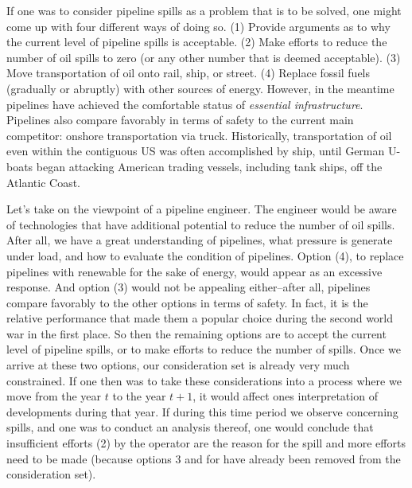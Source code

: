 \documentclass[12pt, man, natbib]{apa6}
\begin{document}
	If one was to consider pipeline spills as a problem that is to be solved, one might come up with four different ways of doing so. (1) Provide arguments as to why the current level of pipeline spills is acceptable. (2) Make efforts to reduce the number of oil spills to zero (or any other number that is deemed acceptable). (3) Move transportation of oil onto rail, ship, or street. (4) Replace fossil fuels (gradually or abruptly) with other sources of energy. However, in the meantime pipelines have achieved the comfortable status of \textit{essential infrastructure}. Pipelines also compare favorably in terms of safety to the current main competitor: onshore transportation via truck. Historically, transportation of oil even within the contiguous US was often accomplished by ship, until German U-boats began attacking American trading vessels, including tank ships, off the Atlantic Coast.
	
	Let's take on the viewpoint of a pipeline engineer. The engineer would be aware of technologies that have additional potential to reduce the number of oil spills. After all, we have a great understanding of pipelines, what pressure is generate under load, and how to evaluate the condition of pipelines. Option (4), to replace pipelines with renewable for the sake of energy, would appear as an excessive response. And option (3) would not be appealing either--after all, pipelines compare favorably to the other options in terms of safety. In fact, it is the relative performance that made them a popular choice during the second world war in the first place. So then the remaining options are to accept the current level of pipeline spills, or to make efforts to reduce the number of spills. Once we arrive at these two options, our consideration set is already very much constrained. If one then was to take these considerations into a process where we move from the year $t$ to the year $t+1$, it would affect ones interpretation of developments during that year. If during this time period we observe concerning spills, and one was to conduct an analysis thereof, one would conclude that insufficient efforts (2) by the operator are the reason for the spill and more efforts need to be made (because options 3 and for have already been removed from the consideration set).
	
\end{document}
